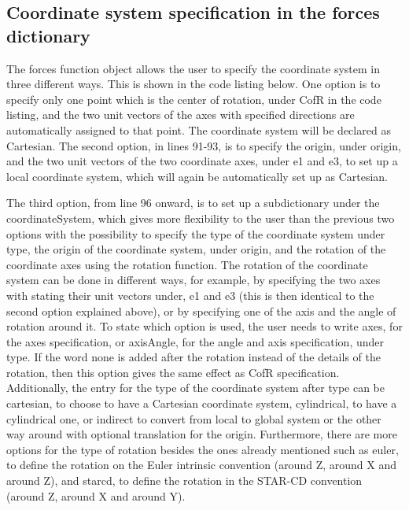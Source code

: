 \subsection{Coordinate system specification in the forces dictionary}
The forces function object allows the user to specify the coordinate system in three different ways. This is shown in the code listing below. One option is to specify only one point which is the center of rotation, under CofR in the code listing, and the two unit vectors of the axes with specified directions are automatically assigned to that point. The coordinate system will be declared as Cartesian. The
second option, in lines 91-93, is to specify the origin, under origin, and the two unit vectors of the two coordinate axes, under e1 and e3, to set up a local coordinate system, which will again be automatically set up as Cartesian.

The third option, from line 96 onward, is to set up a subdictionary under the coordinateSystem, which gives more flexibility to the user than the previous two options with the possibility to specify the type of the coordinate system under type, the origin of the coordinate system, under origin, and the rotation of the coordinate axes using the rotation function. The rotation of the coordinate system can be done in different ways, for example, by specifying the two axes with stating their
unit vectors under, e1 and e3 (this is then identical to the second option explained above), or by specifying one of the axis and the angle of rotation around it. To state which option is used, the user needs to write axes, for the axes specification, or axisAngle, for the angle and axis specification, under type. If the word none is added after the rotation instead of the details of the rotation, then
this option gives the same effect as CofR specification. Additionally, the entry for the type of the coordinate system after type can be cartesian, to choose to have a Cartesian coordinate system, cylindrical, to have a cylindrical one, or indirect to convert from local to global system or the other way around with optional translation for the origin. Furthermore, there are more options for the type of rotation besides the ones already mentioned such as euler, to define the rotation on the Euler intrinsic convention (around Z, around X and around Z), and starcd, to define the rotation in the STAR-CD convention (around Z, around X and around Y).

